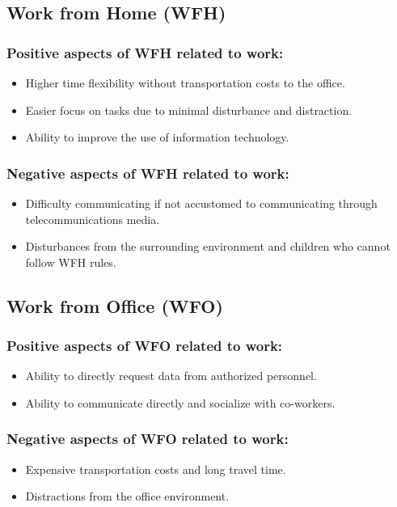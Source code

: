 \documentclass[conference]{IEEEtran}
\begin{document}
\subsection{Work from Home (WFH)}
\subsubsection{Positive aspects of WFH related to work:}
\begin{itemize}
\item Higher time flexibility without transportation costs to the office.
\item Easier focus on tasks due to minimal disturbance and distraction.
\item Ability to improve the use of information technology.
\end{itemize}

\subsubsection{Negative aspects of WFH related to work:}
\begin{itemize}
\item Difficulty communicating if not accustomed to communicating through telecommunications media.
\item Disturbances from the surrounding environment and children who cannot follow WFH rules.
\end{itemize}

\subsection{Work from Office (WFO)}
\subsubsection{Positive aspects of WFO related to work:}
\begin{itemize}
\item Ability to directly request data from authorized personnel.
\item Ability to communicate directly and socialize with co-workers.
\end{itemize}

\subsubsection{Negative aspects of WFO related to work:}
\begin{itemize}
\item Expensive transportation costs and long travel time.
\item Distractions from the office environment.
\end{itemize}
\end{document}
